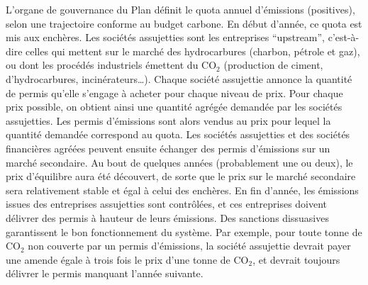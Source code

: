 \documentclass[a5paper,french]{memoir}
\begin{document}
L'organe de gouvernance du Plan définit le quota annuel d'émissions (positives), selon une trajectoire conforme au budget carbone. En début d'année, ce quota est mis aux enchères. %
Les sociétés assujetties sont les entreprises ``upstream'', c'est-à-dire celles qui mettent sur le marché des hydrocarbures (charbon, pétrole et gaz), ou dont les procédés industriels émettent du CO$_\text{2}$ (production de ciment, d'hydrocarbures, incinérateurs\dots). 
Chaque société assujettie annonce la quantité de permis qu'elle s'engage à acheter pour chaque niveau de prix. Pour chaque prix possible, on obtient ainsi une quantité agrégée demandée par les sociétés assujetties. Les permis d'émissions sont alors vendus au prix pour lequel la quantité demandée correspond au quota. Les sociétés assujetties et des sociétés financières agréées peuvent ensuite échanger des permis d'émissions sur un marché secondaire. Au bout de quelques années (probablement une ou deux), le prix d'équilibre aura été découvert, de sorte que le prix sur le marché secondaire sera relativement stable et égal à celui des enchères. En fin d'année, les émissions issues des entreprises assujetties sont contrôlées, et ces entreprises doivent délivrer des permis à hauteur de leurs émissions. %
Des sanctions dissuasives garantissent le bon fonctionnement du système. Par exemple, pour toute tonne de CO$_\text{2}$ non couverte par un permis d'émissions, la société assujettie devrait payer une amende égale à trois fois le prix d'une tonne de CO$_\text{2}$, et devrait toujours délivrer le permis manquant l'année suivante. %
\end{document}
